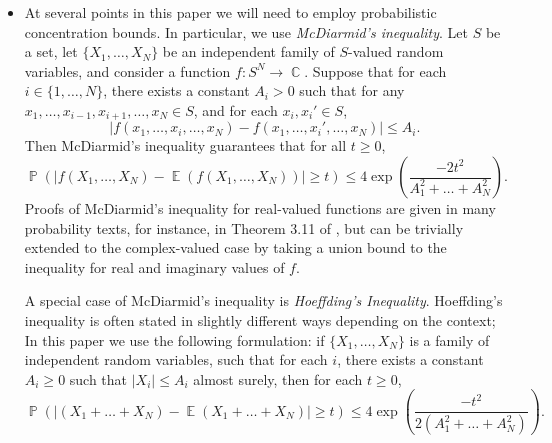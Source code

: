 \documentclass[dvipsnames,letterpaper,12pt]{article}
\numberwithin{equation}{section}
\DeclareMathOperator{\CC}{\mathbb{C}}
\numberwithin{theorem}{section}
\DeclareMathOperator{\EE}{\mathbb{E}}
\DeclareMathOperator{\PP}{\mathbb{P}}
\newcommand{\psitwo}[1]{\| {#1} \|_{\psi_2(L)}}
\begin{document}
\begin{itemize}
    \item At several points in this paper we will need to employ probabilistic concentration bounds. In particular, we use \emph{McDiarmid's inequality}. Let $S$ be a set, let $\{ X_1, \dots, X_N \}$ be an independent family of $S$-valued random variables, and consider a function $f: S^N \to \CC$. Suppose that for each $i \in \{ 1, \dots, N \}$, there exists a constant $A_i > 0$ such that for any $x_1, \dots, x_{i-1}, x_{i+1}, \dots, x_N \in S$, and for each $x_i, x_i' \in S$,
    \[ |f(x_1, \dots, x_i, \dots, x_N) - f(x_1, \dots, x_i', \dots, x_N)| \leq A_i. \]
    Then McDiarmid's inequality guarantees that for all $t \geq 0$,
    \[ \PP \left( |f(X_1, \dots, X_N) - \EE(f(X_1, \dots, X_N))| \geq t \right) \leq 4 \exp \left( \frac{-2t^2}{A_1^2 + \dots + A_N^2} \right). \]
    Proofs of McDiarmid's inequality for real-valued functions are given in many probability texts, for instance, in Theorem 3.11 of \cite{VanHandel}, but can be trivially extended to the complex-valued case by taking a union bound to the inequality for real and imaginary values of $f$.

    A special case of McDiarmid's inequality is \emph{Hoeffding's Inequality}. Hoeffding's inequality is often stated in slightly different ways depending on the context; In this paper we use the following formulation: if $\{ X_1, \dots, X_N \}$ is a family of independent random variables, such that for each $i$, there exists a constant $A_i \geq 0$ such that $|X_i| \leq A_i$ almost surely, then for each $t \geq 0$,
    \[ \PP \left( |(X_1 + \dots + X_N) - \EE(X_1 + \dots + X_N)| \geq t \right) \leq 4 \exp \left(\frac{-t^2}{2(A_1^2 + \dots + A_N^2)} \right). \]

    \begin{comment}

    \item Our random construction involves a probabilistic concentration of measure argument. Define a convex function $\psi_2: [0,\infty) \to [0,\infty)$ by setting
    \[ \psi_2(t) = e^{t^2} - 1, \]
    The function $\psi_2$ induces an Orlicz norm on the family of scalar valued random variables over a probability space by setting, for each random variable $X$,
    \[ \psitwo{X} = \inf \left\{ A \in (0,\infty) : \EE(\psi_2(|X|/A)) \leq 1 \right\}. \]
    The family of random variables with $\psitwo{X} < \infty$ are known as \emph{subgaussian random variables}. Here are the important properties of subgaussian random variables which we use in this paper:
    \begin{itemize}
        \item If $\psitwo{X} \leq A$, then for each $t \geq 0$,
        \[ \PP \left( |X| \geq t \right) \leq 10 \exp \left( -t^2/10A^2 \right). \]
        Thus Subgaussian random variables have Gaussian tails.


\end{comment}
\end{itemize}
\end{document}
